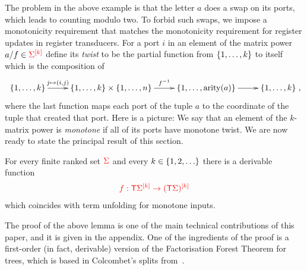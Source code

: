 The problem in the above example is that the letter $a$ does a swap on its ports, which leads to counting modulo two. To forbid such swaps, we impose a monotonicity requirement that matches the monotonicity requirement for register updates in register transducers.
For a port $i$ in an element of the matrix power $a/f \in \mati k \rSigma$ define its \emph{twist} to be the partial function from $\set{1,\ldots,k}$ to itself 
which is the composition of 
\begin{align*}
\xymatrix{
    \set{1,\ldots,k} \ar[r]^-{j \mapsto {(i,j)}} & \set{1,\ldots,k} \times \set{1,\ldots,n} \ar[r]^-{f^{-1}} & \set{1,\ldots,\arity a} \ar[r] & \set{1,\ldots,k}
},
\end{align*}
where the last function maps each port of the tuple $a$ to the coordinate of the tuple that created that port. Here is a picture:
 We say that an element of the $k$-matrix power is \emph{monotone} if all of its ports have monotone twist.
 We are now ready to state the principal result of this section.

\begin{proposition}\label{prop:monotone-unfold}
    For every finite ranked set $\rSigma$ and every $k \in \set{1,2,\ldots}$ there is a derivable function 
    \begin{align*}
    \ranked{ f : \tmonad \mati k \Sigma \to \mati k {(\tmonad \Sigma)}}
    \end{align*}
    which coincides with term unfolding for monotone inputs.
\end{proposition}
The proof of the  above lemma is one of the main technical contributions of this paper, and it is given in the appendix. One of the ingredients of the proof is a first-order (in fact, derivable) version of the Factorisation Forest Theorem for trees, which is based in Colcombet's splits from~\cite{colcombetCombinatorialTheoremTrees2007}.  

